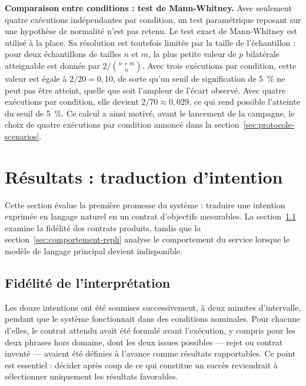 \textbf{Comparaison entre conditions : test de Mann-Whitney.} Avec seulement quatre exécutions indépendantes par condition, un test paramétrique reposant sur une hypothèse de normalité n'est pas retenu. Le test exact de Mann-Whitney est utilisé à la place. Sa résolution est toutefois limitée par la taille de l'échantillon : pour deux échantillons de tailles $n$ et $m$, la plus petite valeur de $p$ bilatérale atteignable est donnée par $2 / \binom{n+m}{n}$. Avec trois exécutions par condition, cette valeur est égale à $2/20 = 0{,}10$, de sorte qu'un seuil de signification de 5~\% ne peut pas être atteint, quelle que soit l'ampleur de l'écart observé. Avec quatre exécutions par condition, elle devient $2/70 \approx 0{,}029$, ce qui rend possible l'atteinte du seuil de 5~\%. Ce calcul a ainsi motivé, avant le lancement de la campagne, le choix de quatre exécutions par condition annoncé dans la section~\ref{sec:protocole-scenarios}.

\newpage
\section{Résultats : traduction d'intention}
\label{sec:resultats-intention}

Cette section évalue la première promesse du système : traduire une intention exprimée en langage naturel en un contrat d'objectifs mesurables. La section~\ref{sec:fidelite-interpretation} examine la fidélité des contrats produits, tandis que la section~\ref{sec:comportement-repli} analyse le comportement du service lorsque le modèle de langage principal devient indisponible.

\subsection{Fidélité de l'interprétation}
\label{sec:fidelite-interpretation}

Les douze intentions ont été soumises successivement, à deux minutes d'intervalle, pendant que le système fonctionnait dans des conditions nominales. Pour chacune d'elles, le contrat attendu avait été formulé avant l'exécution, y compris pour les deux phrases hors domaine, dont les deux issues possibles — rejet ou contrat inventé — avaient été définies à l'avance comme résultats rapportables. Ce point est essentiel : décider après coup de ce qui constitue un succès reviendrait à sélectionner uniquement les résultats favorables.

